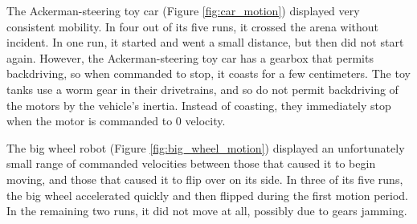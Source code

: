 The Ackerman-steering toy car (Figure \ref{fig:car_motion}) displayed very consistent mobility. In four out of its five runs, it crossed the arena without incident. 
In one run, it started and went a small distance, but then did not start again. 
However, the Ackerman-steering toy car has a gearbox that permits backdriving, so when commanded to stop, it coasts for a few centimeters. 
The toy tanks use a worm gear in their drivetrains, and so do not permit backdriving of the motors by the vehicle's inertia. 
Instead of coasting, they immediately stop when the motor is commanded to 0 velocity. 

The big wheel robot (Figure \ref{fig:big_wheel_motion}) displayed an unfortunately small range of commanded velocities between those that caused it to begin moving, and those that caused it to flip over on its side.
In three of its five runs, the big wheel accelerated quickly and then flipped during the first motion period. 
In the remaining two runs, it did not move at all, possibly due to gears jamming. 


